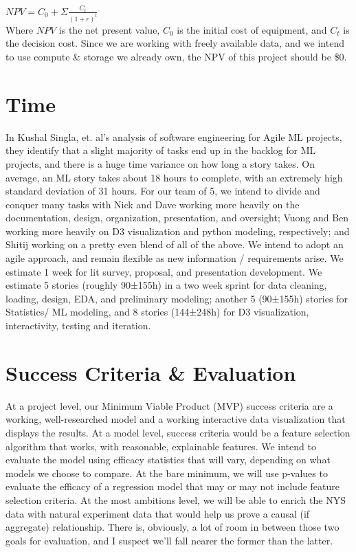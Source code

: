 \documentclass[sigconf,nonacm,11pt]{acmart}
\begin{document}
$NPV = C_0 + \Sigma{\frac{C_t}{(1+r)^t}}$\\

Where $NPV$ is the net present value, $C_0$ is the initial cost of equipment, and $C_t$ is the decision cost. Since we are working with freely available data, and we intend to use compute \& storage we already own, the NPV of this project should be \$0.


\section{Time}
In Kushal Singla, et. al's analysis \cite{mltime} of software engineering for Agile ML projects, they identify that a slight majority of tasks end up in the backlog for ML projects, and there is a huge time variance on how long a story takes. On average, an ML story takes about 18 hours to complete, with an extremely high standard deviation of 31 hours.  For our team of 5, we intend to divide and conquer many tasks with Nick and Dave working more heavily on the documentation, design, organization, presentation, and oversight; Vuong and Ben working more heavily on D3 visualization and python modeling, respectively; and Shitij working on a pretty even blend of all of the above.  We intend to adopt an agile approach, and remain flexible as new information / requirements arise.  We estimate 1 week for lit survey, proposal, and presentation development.  We estimate 5 stories (roughly 90±155h) in a two week sprint for data cleaning, loading, design, EDA, and preliminary modeling; another 5 (90±155h) stories for Statistics/ ML modeling, and 8 stories (144±248h) for D3 visualization, interactivity, testing and iteration.

\section{Success Criteria \& Evaluation}
At a project level, our Minimum Viable Product (MVP) success criteria are a working, well-researched model and a working interactive data visualization that displays the results.  At a model level, success criteria would be a feature selection algorithm that works, with reasonable, explainable features.  We intend to evaluate the model using efficacy statistics that will vary, depending on what models we choose to compare.  At the bare minimum, we will use p-values to evaluate the efficacy of a regression model that may or may not include feature selection criteria.  At the most ambitions level, we will be able to enrich the NYS data with natural experiment data that would help us prove a causal (if aggregate) relationship.  There is, obviously, a lot of room in between those two goals for evaluation, and I suspect we'll fall nearer the former than the latter.  
\end{document}
